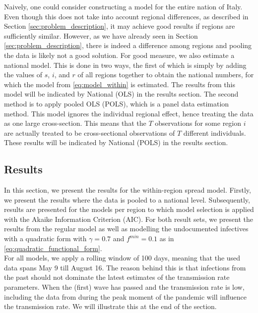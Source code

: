 \documentclass[12pt]{article}
\begin{document}
	Naively, one could consider constructing a model for the entire nation of Italy. Even though this does not take into account regional differences, as described in Section \ref{sec:problem_description}, it may achieve good results if regions are sufficiently similar. However, as we have already seen in Section \ref{sec:problem_description}, there is indeed a difference among regions and pooling the data is likely not a good solution. For good measure, we also estimate a national model. This is done in two ways, the first of which is simply by adding the values of $s$, $i$, and $r$ of all regions together to obtain the national numbers, for which the model from \eqref{eq:model_within} is estimated. The results from this model will be indicated by National (OLS) in the results section. The second method is to apply pooled OLS (POLS), which is a panel data estimation method. This model ignores the individual regional effect, hence treating the data as one large cross-section. This means that the $T$ observations for some region $i$ are actually treated to be cross-sectional observations of $T$ different individuals. These results will be indicated by National (POLS) in the results section.
	
    \subsection{Results} \label{subsec:model_within_results}
	In this section, we present the results for the within-region spread model. Firstly, we present the results where the data is pooled to a national level. Subsequently, results are presented for the models per region to which model selection is applied with the Akaike Information Criterion (AIC). For both result sets, we present the results from the regular model as well as modelling the undocumented infectives with a quadratic form with $\gamma = 0.7$ and $f^{min} = 0.1$ as in \eqref{eq:quadratic_functional_form}. \\
	
	For all models, we apply a rolling window of 100 days, meaning that the used data spans May 9 till August 16. The reason behind this is that infections from the past should not dominate the latest estimates of the transmission rate parameters. When the (first) wave has passed and the transmission rate is low, including the data from during the peak moment of the pandemic will influence the transmission rate. We will illustrate this at the end of the section. \\
	
\end{document}
